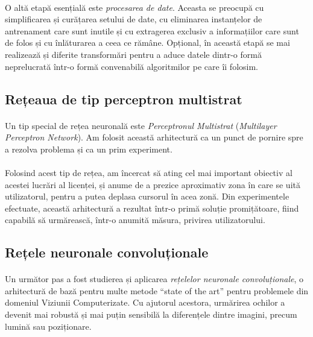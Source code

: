 \paragraph{}
O altă etapă esențială este \emph{procesarea de date}.
Aceasta se preocupă cu simplificarea și curățarea setului de date, cu eliminarea instanțelor de antrenament care sunt inutile și cu extragerea exclusiv a informațiilor care sunt de folos și cu înlăturarea a ceea ce rămâne.
Opțional, în această etapă se mai realizează și diferite transformări pentru a aduce datele dintr-o formă neprelucrată într-o formă convenabilă algoritmilor pe care îi folosim.

\subsection{Rețeaua de tip perceptron multistrat}
\paragraph{}
Un tip special de rețea neuronală este \emph{Perceptronul Multistrat} (\emph{Multilayer Perceptron Network}).
Am folosit această arhitectură ca un punct de pornire spre a rezolva problema și ca un prim experiment.

\paragraph{}
Folosind acest tip de rețea, am încercat să ating cel mai important obiectiv al acestei lucrări al licenței, și anume de a prezice aproximativ zona în care se uită utilizatorul, pentru a putea deplasa cursorul în acea zonă.
Din experimentele efectuate, această arhitectură a rezultat într-o primă soluție promițătoare, fiind capabilă să urmărească, într-o anumită măsura, privirea utilizatorului.

\subsection{Rețele neuronale convoluționale}
\paragraph{}
Un următor pas a fost studierea și aplicarea \emph{rețelelor neuronale convoluționale}, o arhitectură de bază pentru multe metode ``state of the art'' pentru problemele din domeniul Viziunii Computerizate.
Cu ajutorul acestora, urmărirea ochilor a devenit mai robustă și mai puțin sensibilă la diferențele dintre imagini, precum lumină sau poziționare.


